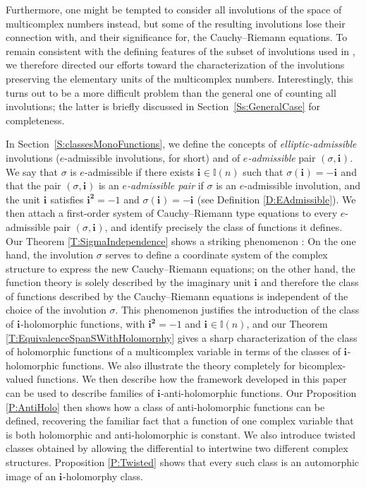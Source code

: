 \documentclass[12pt]{amsart}
\theoremstyle{plain}
\theoremstyle{definition}
\numberwithin{equation}{section}
\newcommand{\im}[1]{\mathbf{ i_{#1}}}
\newcommand{\ims}[1]{\mathbf{ i_{#1}^2}}
\newcommand{\mI}{\mathbb{I}}
\begin{document}
Furthermore, one might be tempted to consider all involutions of the space of multicomplex numbers instead, but some of the resulting involutions lose their connection with, and their significance for, the Cauchy--Riemann equations. 
To remain consistent with the defining features of the subset of involutions used in \cite{Struppa2012}, we therefore directed our efforts toward the characterization of the involutions preserving the elementary units of the multicomplex numbers. 
Interestingly, this turns out to be a more difficult problem than the general one of counting all involutions; the latter is briefly discussed in Section~\ref{Ss:GeneralCase} for completeness.

In Section~\ref{S:classesMonoFunctions}, we define the concepts of \emph{elliptic-admissible} involutions ($e$-admissible involutions, for short)  and of \emph{$e$-admissible} pair $(\sigma, \im{})$. We say that $\sigma$ is $e$-admissible if there exists $\im{} \in \mI (n)$ such that $\sigma (\im{}) = - \im{}$ and that the pair $(\sigma, \im{})$ is an \emph{$e$-admissible pair} if $\sigma$ is an $e$-admissible involution, and the unit $\im{}$ satisfies $\ims{} = -1$ and $\sigma (\im{}) = - \im{}$ (see Definition \ref{D:EAdmissible}). 
We then attach a first-order system of Cauchy--Riemann type equations to every $e$-admissible pair $(\sigma, \im{})$, and identify precisely the class of functions it defines. Our Theorem \ref{T:SigmaIndependence} shows a striking phenomenon : On the one hand, the involution $\sigma$ serves to define a coordinate system of the complex structure to express the new Cauchy--Riemann equations; on the other hand, the function theory is solely described by the imaginary unit $\im{}$ and therefore the class of functions described by the Cauchy--Riemann equations is independent of the choice of the involution $\sigma$. This phenomenon justifies the introduction of the class of $\im{}$-holomorphic functions, with $\ims{} = -1$ and $\im{} \in \mI (n)$, and our Theorem \ref{T:EquivalenceSpanSWithHolomorphy} gives a sharp characterization of the class of holomorphic functions of a multicomplex variable in terms of the classes of $\im{}$-holomorphic functions. We also illustrate the theory completely for bicomplex-valued functions. 
We then describe how the framework developed in this paper can be used to describe families of $\im{}$-anti-holomorphic functions. Our Proposition \ref{P:AntiHolo} then shows how a class of anti-holomorphic functions can be defined, recovering the familiar fact that a function of one complex variable that is both holomorphic and anti-holomorphic is constant. We also introduce twisted classes obtained by allowing the differential to intertwine two different complex structures. Proposition \ref{P:Twisted} shows that every such class is an automorphic image of an $\im{}$-holomorphy class.
\end{document}
